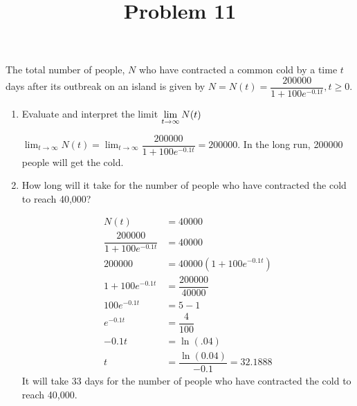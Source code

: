 \documentclass{ximera}
\title[Problem 11]{Problem 11}
\begin{document}
\begin{abstract} \end{abstract}
\maketitle


\begin{problem}
The total number of people, $N$ who have contracted a common cold by a time $t$ days after its outbreak on an island is given by 
$N=N(t)= \dfrac{200000}{1+100e^{-0.1t}},t\geq0$.

	\begin{enumerate}
		\item Evaluate and interpret the limit $\displaystyle \displaystyle \lim_{t \to \infty} N(t)$
\begin{explanation}	
			$\displaystyle \lim_{t \to \infty} N(t)=\displaystyle \lim_{t \to \infty} \dfrac{200000}{1+100e^{-0.1t}}=200000$.  In the long run, 200000 people will get the cold.
			\end{explanation}
		\item How long will it take for the number of people who have contracted the cold to reach 40,000?
\begin{explanation}
				\begin{align*}
				N(t)&=40000\\
				\dfrac{200000}{1+100e^{-0.1t}}&=40000\\
				200000&=40000(1+100e^{-0.1t})\\
				1+100e^{-0.1t}&=\dfrac{200000}{40000}\\
				100e^{-0.1t}&=5-1\\
				e^{-0.1t}&=\dfrac{4}{100}\\
				-0.1t&=\ln(.04)\\
				t&=\dfrac{\ln(0.04)}{-0.1}=32.1888
				\end{align*}
			It will take 33 days for the number of people who have contracted the cold to reach 40,000.
			\end{explanation}


\end{enumerate}
\end{problem}
\end{document}
